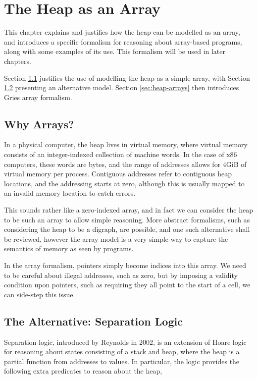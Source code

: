 \chapter{The Heap as an Array}
\label{sec:heap}

This chapter explains and justifies how the heap can be modelled as an
array, and introduces a specific formalism for reasoning about
array-based programs, along with some examples of its use. This
formalism will be used in later chapters.

Section \ref{sec:heap-why} justifies the use of modelling the heap as
a simple array, with Section \ref{sec:heap-separation} presenting an
alternative model. Section \ref{sec:heap-arrays} then introduces Gries
array formalism\cite{Gries87}.

\section{Why Arrays?}
\label{sec:heap-why}

In a physical computer, the heap lives in virtual memory, where
virtual memory consists of an integer-indexed collection of machine
words. In the case of x86 computers, these words are bytes, and the
range of addresses allows for 4GiB of virtual memory per
process. Contiguous addresses refer to contiguous heap locations, and
the addressing starts at zero, although this is usually mapped to an
invalid memory location to catch errors.

This sounds rather like a zero-indexed array, and in fact we can
consider the heap to be such an array to allow simple reasoning. More
abstract formalisms, such as considering the heap to be a digraph, are
possible, and one such alternative shall be reviewed, however the
array model is a very simple way to capture the semantics of memory as
seen by programs.

In the array formalism, pointers simply become indices into this
array. We need to be careful about illegal addresses, such as zero,
but by imposing a validity condition upon pointers, such as requiring
they all point to the start of a cell, we can side-step this issue.

\section{The Alternative: Separation Logic}
\label{sec:heap-separation}

Separation logic, introduced by Reynolds in 2002\cite{Reynolds02}, is
an extension of Hoare logic for reasoning about states consisting of a
stack and heap, where the heap is a partial function from addresses to
values. In particular, the logic provides the following extra
predicates to reason about the heap,


